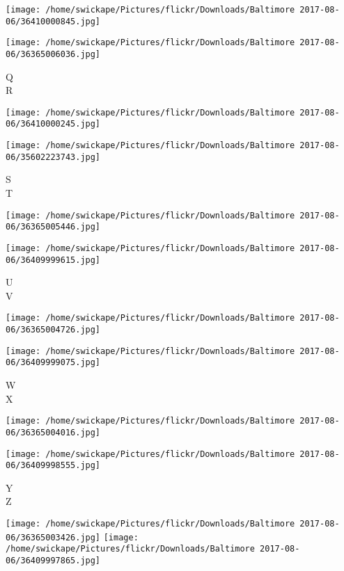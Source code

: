 \documentclass[10pt,letterpaper]{article}
\begin{document}
\texttt{[image: /home/swickape/Pictures/flickr/Downloads/Baltimore 2017-08-06/36410000845.jpg]}

\vspace{0.25in}
\texttt{[image: /home/swickape/Pictures/flickr/Downloads/Baltimore 2017-08-06/36365006036.jpg]}

Q\\
R
\pagebreak

\texttt{[image: /home/swickape/Pictures/flickr/Downloads/Baltimore 2017-08-06/36410000245.jpg]}

\vspace{0.25in}
\texttt{[image: /home/swickape/Pictures/flickr/Downloads/Baltimore 2017-08-06/35602223743.jpg]}

S\\
T
\pagebreak

\texttt{[image: /home/swickape/Pictures/flickr/Downloads/Baltimore 2017-08-06/36365005446.jpg]}

\vspace{0.25in}
\texttt{[image: /home/swickape/Pictures/flickr/Downloads/Baltimore 2017-08-06/36409999615.jpg]}

U\\
V
\pagebreak

\texttt{[image: /home/swickape/Pictures/flickr/Downloads/Baltimore 2017-08-06/36365004726.jpg]}

\vspace{0.25in}
\texttt{[image: /home/swickape/Pictures/flickr/Downloads/Baltimore 2017-08-06/36409999075.jpg]}

W\\
X
\pagebreak

\texttt{[image: /home/swickape/Pictures/flickr/Downloads/Baltimore 2017-08-06/36365004016.jpg]}

\vspace{0.25in}
\texttt{[image: /home/swickape/Pictures/flickr/Downloads/Baltimore 2017-08-06/36409998555.jpg]}

Y\\
Z
\pagebreak

\texttt{[image: /home/swickape/Pictures/flickr/Downloads/Baltimore 2017-08-06/36365003426.jpg]}
\texttt{[image: /home/swickape/Pictures/flickr/Downloads/Baltimore 2017-08-06/36409997865.jpg]}
\end{document}
